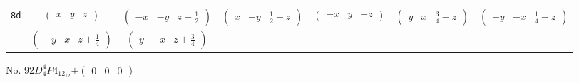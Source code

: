 \documentclass[fleqn,9pt,landscape]{jsarticle}
\begin{document}
\begin{center}
\begin{longtable}{ccccccc}
{\tt 8d} & $ \begin{pmatrix} x & y & z \end{pmatrix} $ & $ \begin{pmatrix} - x & - y & z + \frac{1}{2} \end{pmatrix} $ & $ \begin{pmatrix} x & - y & \frac{1}{2} - z \end{pmatrix} $ & $ \begin{pmatrix} - x & y & - z \end{pmatrix} $ & $ \begin{pmatrix} y & x & \frac{3}{4} - z \end{pmatrix} $ & $ \begin{pmatrix} - y & - x & \frac{1}{4} - z \end{pmatrix} $ \\
& $ \begin{pmatrix} - y & x & z + \frac{1}{4} \end{pmatrix} $ & $ \begin{pmatrix} y & - x & z + \frac{3}{4} \end{pmatrix} $ & $  $ & $  $ & $  $ & $  $ \\
\end{longtable}
\end{center}
\newpage
No. 92\quad$D_{4}^{4}$\quad$P4_12_12$\quad[ tetragonal ]\quad$+\begin{pmatrix} 0 & 0 & 0 \end{pmatrix}$
\end{document}
